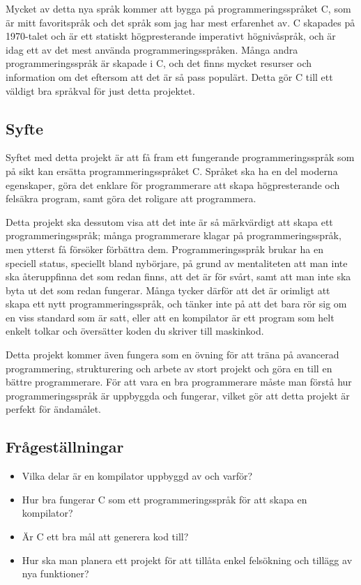 \documentclass{theme}
\begin{document}
Mycket av detta nya språk kommer att bygga på programmeringsspråket C, som är
mitt favoritspråk och det språk som jag har mest erfarenhet av. C skapades på
1970-talet och är ett statiskt högpresterande imperativt högnivåspråk, och är
idag ett av det mest använda programmeringsspråken. Många andra
programmeringsspråk är skapade i C, och det finns mycket resurser och
information om det eftersom att det är så pass populärt. Detta gör C till ett
väldigt bra språkval för just detta projektet.

\subsection{Syfte}

Syftet med detta projekt är att få fram ett fungerande programmeringsspråk som
på sikt kan ersätta programmeringsspråket C. Språket ska ha en del moderna
egenskaper, göra det enklare för programmerare att skapa högpresterande
och felsäkra program, samt göra det roligare att programmera.

Detta projekt ska dessutom visa att det inte är så märkvärdigt att skapa ett
programmeringsspråk; många programmerare klagar på programmeringsspråk, men
ytterst få försöker förbättra dem. Programmeringsspråk brukar ha en speciell
status, speciellt bland nybörjare, på grund av mentaliteten att man inte ska
återuppfinna det som redan finns, att det är för svårt, samt att man inte ska
byta ut det som redan fungerar. Många tycker därför att det är orimligt att
skapa ett nytt programmeringsspråk, och tänker inte på att det bara rör sig om
en viss standard som är satt, eller att en kompilator är ett program som helt
enkelt tolkar och översätter koden du skriver till maskinkod.

Detta projekt kommer även fungera som en övning för att träna på avancerad
programmering, strukturering och arbete av stort projekt och göra en till en
bättre programmerare. För att vara en bra programmerare måste man förstå hur
programmeringsspråk är uppbyggda och fungerar, vilket gör att detta projekt är
perfekt för ändamålet.

\subsection{Frågeställningar}

\begin{itemize}
	\item Vilka delar är en kompilator uppbyggd av och varför?

	\item Hur bra fungerar C som ett programmeringsspråk för att skapa en
		kompilator?

	\item Är C ett bra mål att generera kod till?

	\item Hur ska man planera ett projekt för att tillåta enkel felsökning och
		tillägg av nya funktioner?

\end{itemize}
\end{document}
